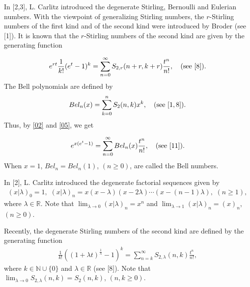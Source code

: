 \documentclass[10pt,twoside,reqno]{amsart}
\numberwithin{equation}{section}
\begin{document}
In [2,3], L. Carlitz introduced the degenerate Stirling, Bernoulli and Eulerian numbers. With the viewpoint of  generalizing Stirling numbers, the $r$-Stirling numbers of the first kind and of the second kind were introduced by Broder (see [1]). It is known that the $r$-Stirling numbers of the second kind are given by the generating function 

\begin{equation}\begin{split}\label{04}
e^{rt} \frac{1}{k!} (e^t-1)^k = \sum_{n=0}^\infty S_{2,r} (n+r,k+r) \frac{t^n}{n!},\quad (\textnormal{see} \,\, [8]).
\end{split}\end{equation}
The Bell polynomials are defined by 
\begin{equation}\begin{split}\label{05}
Bel_n(x) = \sum_{k=0}^n S_2(n,k) x^k,\quad (\textnormal{see} \,\, [1,8]).
\end{split}\end{equation}
Thus, by \eqref{02} and \eqref{05}, we get

\begin{equation}\begin{split}\label{06}
e^{x(e^t-1)} = \sum_{n=0}^\infty Bel_n(x) \frac{t^n}{n!},\quad (\textnormal{see} \,\, [11]).
\end{split}\end{equation}
When $x=1$, $Bel_n=Bel_n(1)$, $(n \geq 0)$, are called the Bell numbers.

In [2], L. Carlitz introduced the degenerate factorial sequences given by
\begin{equation}\begin{split}\label{07}
(x|\lambda )_0 = 1,\,\, (x|\lambda )_n = x(x-\lambda )(x-2\lambda )\cdots(x-(n-1)\lambda ),\,\, (n \geq 1),
\end{split}\end{equation}
where $\lambda  \in \mathbb{R}$. Note that $\lim_{\lambda  \rightarrow 0}(x|\lambda )_n = x^n$
and $\lim_{\lambda  \rightarrow 1}(x|\lambda )_n = (x)_n$, $(n \geq 0)$.

Recently, the degenerate Stirling numbers of the second kind are defined by the generating function 
\begin{equation}\begin{split}\label{08}
\frac{1}{k!} ((1+\lambda t)^{\frac{1}{\lambda }}-1)^k = \sum_{n=k}^\infty S_{2,\lambda }(n,k) \frac{t^n}{n!},
\end{split}\end{equation}
where $k \in \mathbb{N} \cup \{0\}$ and $\lambda \in \mathbb{R}$ (see [8]). Note that $\lim_{\lambda  \rightarrow 0}S_{2,\lambda }(n,k) = S_2(n,k)$, $(n,k \geq 0)$.
\end{document}
